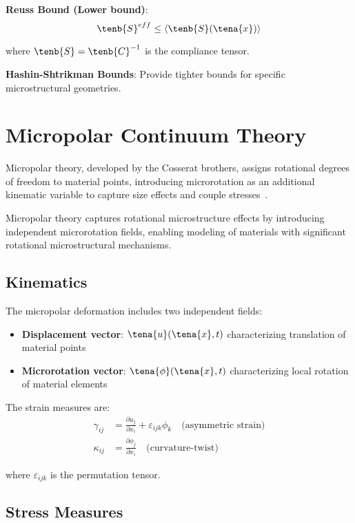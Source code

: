 \textbf{Reuss Bound (Lower bound)}:
\begin{equation}
\tenb{S}^{eff} \leq \langle \tenb{S}(\tena{x}) \rangle
\end{equation}

where $\tenb{S} = \tenb{C}^{-1}$ is the compliance tensor.

\textbf{Hashin-Shtrikman Bounds}: Provide tighter bounds for specific microstructural geometries.

\section{Micropolar Continuum Theory}

Micropolar theory, developed by the Cosserat brothers, assigns rotational degrees of freedom to material points, introducing microrotation as an additional kinematic variable to capture size effects and couple stresses~\autocite{Sadd.2019}.

\begin{keypoint}
Micropolar theory captures rotational microstructure effects by introducing independent microrotation fields, enabling modeling of materials with significant rotational microstructural mechanisms.
\end{keypoint}

\subsection{Kinematics}

The micropolar deformation includes two independent fields:
\begin{itemize}
\item \textbf{Displacement vector}: $\tena{u}(\tena{x}, t)$ characterizing translation of material points
\item \textbf{Microrotation vector}: $\tena{\phi}(\tena{x}, t)$ characterizing local rotation of material elements
\end{itemize}

The strain measures are:
\begin{align}
\gamma_{ij} &= \frac{\partial u_j}{\partial x_i} + \varepsilon_{ijk} \phi_k \quad \text{(asymmetric strain)}\\
\kappa_{ij} &= \frac{\partial \phi_j}{\partial x_i} \quad \text{(curvature-twist)}
\end{align}

where $\varepsilon_{ijk}$ is the permutation tensor.

\subsection{Stress Measures}

